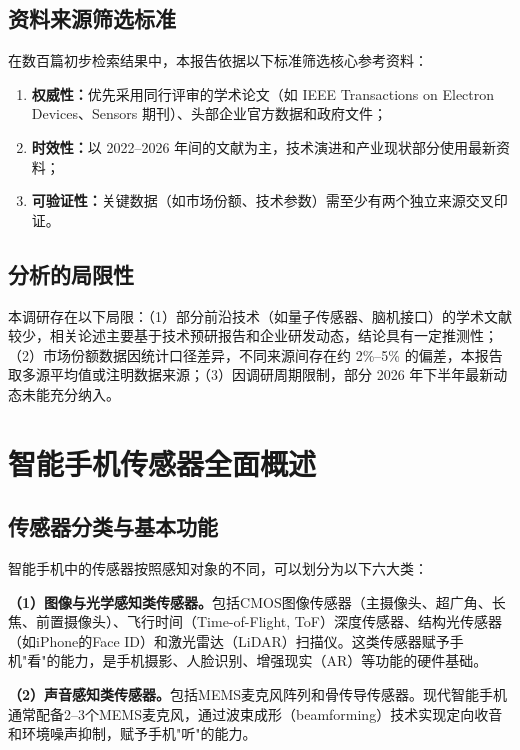 \documentclass[12pt, a4paper]{ctexart}
\begin{document}
\subsection{资料来源筛选标准}

在数百篇初步检索结果中，本报告依据以下标准筛选核心参考资料：
\begin{enumerate}[label=(\arabic*)]
    \item \textbf{权威性：}优先采用同行评审的学术论文（如 IEEE Transactions on Electron Devices、Sensors 期刊）、头部企业官方数据和政府文件；
    \item \textbf{时效性：}以 2022--2026 年间的文献为主，技术演进和产业现状部分使用最新资料；
    \item \textbf{可验证性：}关键数据（如市场份额、技术参数）需至少有两个独立来源交叉印证。
\end{enumerate}

\subsection{分析的局限性}

本调研存在以下局限：（1）部分前沿技术（如量子传感器、脑机接口）的学术文献较少，相关论述主要基于技术预研报告和企业研发动态，结论具有一定推测性；（2）市场份额数据因统计口径差异，不同来源间存在约 2\%--5\% 的偏差，本报告取多源平均值或注明数据来源；（3）因调研周期限制，部分 2026 年下半年最新动态未能充分纳入。


\section{智能手机传感器全面概述}

\subsection{传感器分类与基本功能}

智能手机中的传感器按照感知对象的不同，可以划分为以下六大类：

\textbf{（1）图像与光学感知类传感器。}包括CMOS图像传感器（主摄像头、超广角、长焦、前置摄像头）、飞行时间（Time-of-Flight, ToF）深度传感器、结构光传感器（如iPhone的Face ID）和激光雷达（LiDAR）扫描仪。这类传感器赋予手机"看"的能力，是手机摄影、人脸识别、增强现实（AR）等功能的硬件基础\cite{elgamal2005}。

\textbf{（2）声音感知类传感器。}包括MEMS麦克风阵列和骨传导传感器。现代智能手机通常配备2--3个MEMS麦克风，通过波束成形（beamforming）技术实现定向收音和环境噪声抑制，赋予手机"听"的能力。
\end{document}
